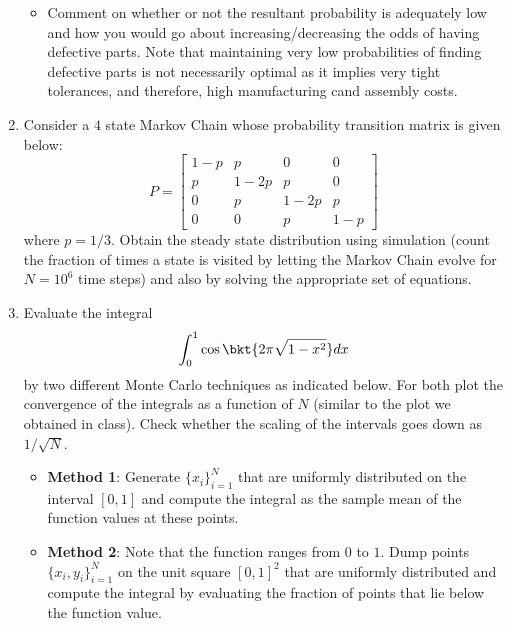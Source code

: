 \documentclass{article}
\begin{document}
\begin{enumerate}
\begin{itemize}
			\item
		Comment on whether or not the resultant probability is adequately low and how you would go about increasing/decreasing the odds of having defective parts. Note that maintaining very low probabilities of finding defective parts is not necessarily optimal as it implies very tight tolerances, and therefore, high manufacturing cand assembly costs.
		\end{itemize}
		\item
		Consider a $4$ state Markov Chain whose probability transition matrix is given below:
		$$P = \begin{bmatrix}
		1-p & p & 0 & 0\\
		p & 1-2p & p & 0\\
		0 & p & 1-2p & p\\
		0 & 0 & p & 1-p
		\end{bmatrix}$$
		where $p=1/3$. Obtain the steady state distribution using simulation (count the fraction of times a state is visited by letting the Markov Chain evolve for $N=10^6$ time steps) and also by solving the appropriate set of equations.

		\item
		Evaluate the integral $$\int_0^1 \cos \bkt{2\pi \sqrt{1-x^2}}dx$$ by two different Monte Carlo techniques as indicated below. For both plot the convergence of the integrals as a function of $N$ (similar to the plot we obtained in class). Check whether the scaling of the intervals goes down as $1/\sqrt{N}$.
		\begin{itemize}
			\item
			\textbf{Method 1}: Generate $\{x_i\}_{i=1}^N$ that are uniformly distributed on the interval $[0,1]$ and compute the integral as the sample mean of the function values at these points.
			\item
			\textbf{Method 2}: Note that the function ranges from $0$ to $1$. Dump points $\{x_i,y_i\}_{i=1}^N$ on the unit square $[0,1]^2$ that are uniformly distributed and compute the integral by evaluating the fraction of points that lie below the function value.
		\end{itemize}
	\end{enumerate}
\end{document}
